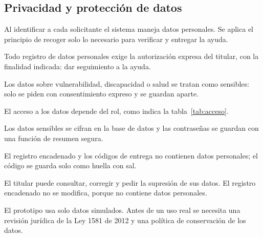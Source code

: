 \subsection{Privacidad y protección de datos}
Al identificar a cada solicitante el sistema maneja datos personales. Se aplica el principio de recoger solo lo necesario para verificar y entregar la ayuda.
\begin{description}[leftmargin=0pt]
  \item[RD-14 (\Must).] Todo registro de datos personales exige la autorización expresa del titular, con la finalidad indicada: dar seguimiento a la ayuda.
  \item[RD-15 (\Must).] Los datos sobre vulnerabilidad, discapacidad o salud se tratan como sensibles: solo se piden con consentimiento expreso y se guardan aparte.
  \item[RD-16 (\Must).] El acceso a los datos depende del rol, como indica la tabla~\ref{tab:acceso}.
  \item[RD-17 (\Should).] Los datos sensibles se cifran en la base de datos y las contraseñas se guardan con una función de resumen segura.
  \item[RD-18 (\Should).] El registro encadenado y los códigos de entrega no contienen datos personales; el código se guarda solo como huella con sal.
  \item[RD-19 (\Should).] El titular puede consultar, corregir y pedir la supresión de sus datos. El registro encadenado no se modifica, porque no contiene datos personales.
  \item[RD-20 (\Should).] El prototipo usa solo datos simulados. Antes de un uso real se necesita una revisión jurídica de la Ley 1581 de 2012 y una política de conservación de los datos.
\end{description}

